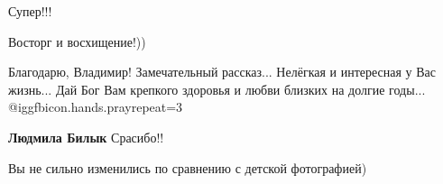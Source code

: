  
 
 
 
 

Супер!!!

Восторг и восхищение!))


Благодарю, Владимир! Замечательный рассказ... Нелёгкая и интересная у Вас
жизнь... Дай Бог Вам крепкого здоровья и любви близких на долгие годы...
@igg{fbicon.hands.pray}{repeat=3} 

\textbf{Людмила Билык} Срасибо!!

Вы не сильно изменились по сравнению с детской фотографией)
